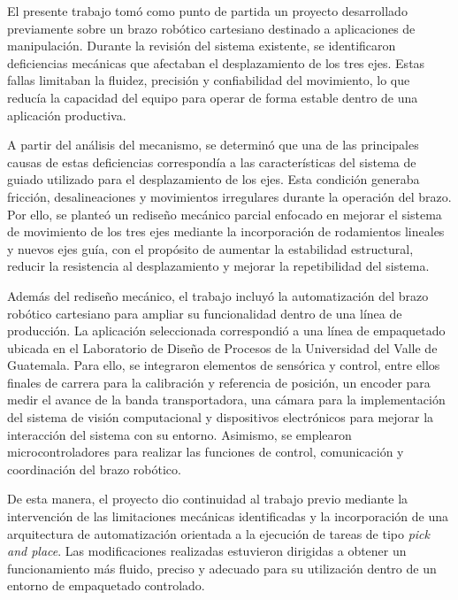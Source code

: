 El presente trabajo tomó como punto de partida un proyecto desarrollado previamente sobre un brazo robótico cartesiano destinado a aplicaciones de manipulación. Durante la revisión del sistema existente, se identificaron deficiencias mecánicas que afectaban el desplazamiento de los tres ejes. Estas fallas limitaban la fluidez, precisión y confiabilidad del movimiento, lo que reducía la capacidad del equipo para operar de forma estable dentro de una aplicación productiva.

A partir del análisis del mecanismo, se determinó que una de las principales causas de estas deficiencias correspondía a las características del sistema de guiado utilizado para el desplazamiento de los ejes. Esta condición generaba fricción, desalineaciones y movimientos irregulares durante la operación del brazo. Por ello, se planteó un rediseño mecánico parcial enfocado en mejorar el sistema de movimiento de los tres ejes mediante la incorporación de rodamientos lineales y nuevos ejes guía, con el propósito de aumentar la estabilidad estructural, reducir la resistencia al desplazamiento y mejorar la repetibilidad del sistema.

Además del rediseño mecánico, el trabajo incluyó la automatización del brazo robótico cartesiano para ampliar su funcionalidad dentro de una línea de producción. La aplicación seleccionada correspondió a una línea de empaquetado ubicada en el Laboratorio de Diseño de Procesos de la Universidad del Valle de Guatemala. Para ello, se integraron elementos de sensórica y control, entre ellos finales de carrera para la calibración y referencia de posición, un encoder para medir el avance de la banda transportadora, una cámara para la implementación del sistema de visión computacional y dispositivos electrónicos para mejorar la interacción del sistema con su entorno. Asimismo, se emplearon microcontroladores para realizar las funciones de control, comunicación y coordinación del brazo robótico.

De esta manera, el proyecto dio continuidad al trabajo previo mediante la intervención de las limitaciones mecánicas identificadas y la incorporación de una arquitectura de automatización orientada a la ejecución de tareas de tipo \textit{pick and place}. Las modificaciones realizadas estuvieron dirigidas a obtener un funcionamiento más fluido, preciso y adecuado para su utilización dentro de un entorno de empaquetado controlado.